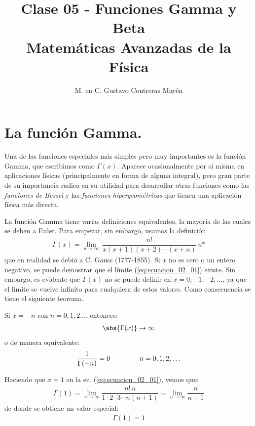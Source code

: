 
\usepackage{apacite}
\title{Clase 05 - Funciones Gamma y Beta \\[0.3em]  \large{Matemáticas Avanzadas de la Física}\vspace{-3ex}}
\author{M. en C. Gustavo Contreras Mayén}
\date{ }

\vspace{-4cm}
\maketitle
\fontsize{14}{14}\selectfont
\tableofcontents
\newpage

\section{La función Gamma.}

Una de las funciones especiales más simples pero muy importantes es la función Gamma, que escribimos como $\Gamma (x)$. Aparece ocasionalmente por sí misma en aplicaciones físicas (principalmente en forma de alguna integral), pero gran parte de su importancia radica en su utilidad para desarrollar otras funciones como las \emph{funciones de Bessel} y las \emph{funciones hipergeométricas} que tienen una aplicación física más directa.
\par
La función Gamma tiene varias definiciones equivalentes, la mayoría de las cuales se deben a Euler. Para empezar, sin embargo, usamos la definición:
\begin{align}
\Gamma (x) = \lim_{n \to \infty} \, \dfrac{n!}{x (x + 1)(x + 2) \cdots (x + n)} \, n^{x}
\label{eq:ecuacion_02_01}
\end{align}
que en realidad se debió a C. Gauss (1777-1855). Si $x$ no es cero o un entero negativo, se puede demostrar que el límite (\ref{eq:ecuacion_02_01}) existe. Sin embargo, es evidente que $\Gamma (x)$ no se puede definir en $x = 0, -1, -2, \ldots$, ya que el límite se vuelve infinito para cualquiera de estos valores. Como consecuencia se tiene el siguiente teorema.

\begin{teo}\label{teorema_01_01}
Si $x = - n$ con $n = 0, 1, 2 \ldots$, entonces:
\begin{align*}
\abs{\Gamma (x)} \to \infty
\end{align*}
o de manera equivalente:
\begin{align*}
\dfrac{1}{\Gamma (-n)} = 0 \hspace{1.5cm} n = 0, 1, 2, \ldots
\end{align*}

Haciendo que $x = 1$ en la ec. (\ref{eq:ecuacion_02_01}), vemos que:
\begin{align*}
\Gamma (1) = \lim_{n \to \infty} \dfrac{n! \, n}{1 \cdot 2 \cdot 3 \cdots n (n + 1)} = \lim_{n \to \infty} \dfrac{n}{n + 1}
\end{align*}
de donde se obtiene un valor especial:
\begin{align}
\Gamma (1) = 1
\label{eq:ecuacion_02_02}
\end{align}
\end{teo}

